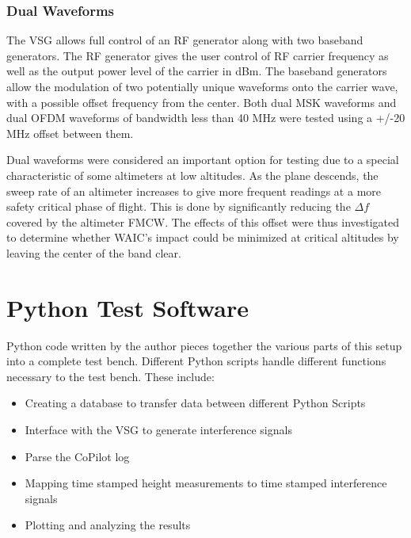 \subsubsection{Dual Waveforms}\label{subsub:Dual}
The VSG allows full control of an RF generator along with two baseband generators. The RF generator gives the user control of RF carrier frequency as well as the output power level of the carrier in dBm. The baseband generators allow the modulation of two potentially unique waveforms onto the carrier wave, with a possible offset frequency from the center. Both dual MSK waveforms and dual OFDM waveforms of bandwidth less than 40 MHz were tested using a +/-20 MHz offset between them. 

Dual waveforms were considered an important option for testing due to a special characteristic of some altimeters at low altitudes. As the plane descends, the sweep rate of an altimeter increases to give more frequent readings at a more safety critical phase of flight. This is done by significantly reducing the $\Delta f$ covered by the altimeter FMCW. The effects of this offset were thus investigated to determine whether WAIC's impact could be minimized at critical altitudes by leaving the center of the band clear. 

\section{Python Test Software}\label{sec:Python}
Python code written by the author pieces together the various parts of this setup into a complete test bench. Different Python scripts handle different functions necessary to the test bench. These include:

\begin{itemize}
\item Creating a database to transfer data between different Python Scripts
\item Interface with the VSG to generate interference signals
\item Parse the CoPilot log
\item Mapping time stamped height measurements to time stamped interference signals
\item Plotting and analyzing the results
\end{itemize}

